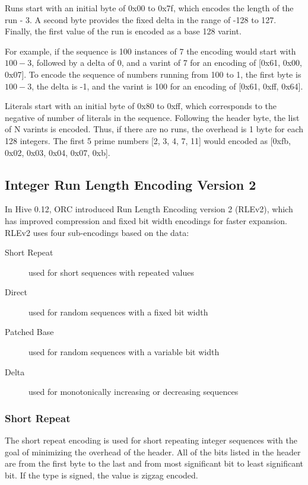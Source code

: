 \documentclass{article}
\begin{document}
Runs start with an initial byte of 0x00 to 0x7f, which encodes the
length of the run - 3. A second byte provides the fixed delta in the
range of -128 to 127. Finally, the first value of the run is encoded
as a base 128 varint.

For example, if the sequence is 100 instances of 7 the encoding would
start with $100 - 3$, followed by a delta of 0, and a varint of 7 for
an encoding of [0x61, 0x00, 0x07]. To encode the sequence of numbers
running from 100 to 1, the first byte is $100 - 3$, the delta is -1,
and the varint is 100 for an encoding of [0x61, 0xff, 0x64].

Literals start with an initial byte of 0x80 to 0xff, which corresponds
to the negative of number of literals in the sequence. Following the
header byte, the list of N varints is encoded.  Thus, if there are
no runs, the overhead is 1 byte for each 128 integers. The first 5
prime numbers [2, 3, 4, 7, 11] would encoded as [0xfb, 0x02, 0x03,
0x04, 0x07, 0xb].

\subsection{Integer Run Length Encoding Version 2}

In Hive 0.12, ORC introduced Run Length Encoding version 2 (RLEv2),
which has improved compression and fixed bit width encodings for
faster expansion. RLEv2 uses four sub-encodings based on the data:

\begin{description}
\item[Short Repeat] used for short sequences with repeated values
\item[Direct] used for random sequences with a fixed bit width
\item[Patched Base] used for random sequences with a variable bit width
\item[Delta] used for monotonically increasing or decreasing sequences
\end{description}

\subsubsection{Short Repeat}

The short repeat encoding is used for short repeating integer
sequences with the goal of minimizing the overhead of the header. All
of the bits listed in the header are from the first byte to the last
and from most significant bit to least significant bit. If the type is
signed, the value is zigzag encoded.
\end{document}
